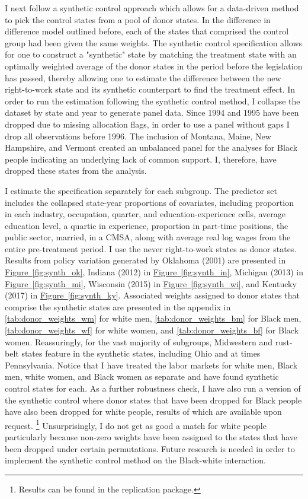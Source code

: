 \documentclass[11pt]{article}
\begin{document}
I next follow a synthetic control approach which allows for a data-driven method to pick the control states from a pool of donor states. In the difference in difference model outlined before, each of the states that comprised the control group had been given the same weights. The synthetic control specification allows for one to construct a "synthetic" state by matching the treatment state with an optimally weighted average of the donor states in the period before the legislation has passed, thereby allowing one to estimate the difference between the new right-to-work state and its synthetic counterpart to find the treatment effect. In order to run the estimation following the synthetic control method, I collapse the dataset by state and year to generate panel data. Since 1994 and 1995 have been dropped due to missing allocation flags, in order to use a panel without gaps I drop all observations before 1996. The inclusion of Montana, Maine, New Hampshire, and Vermont created an unbalanced panel for the analyses for Black people indicating an underlying lack of common support. I, therefore, have dropped these states from the analysis. 

I estimate the specification separately for each subgroup. The predictor set includes the collapsed state-year proportions of covariates, including proportion in each industry, occupation, quarter, and education-experience cells, average education level, a quartic in experience, proportion in part-time positions, the public sector, married, in a CMSA, along with average real log wages from the entire pre-treatment period. I use the never right-to-work states as donor states. Results from policy variation generated by Oklahoma (2001) are presented in \hyperref[fig:synth_ok]{Figure~\ref*{fig:synth_ok}}, Indiana (2012) in \hyperref[fig:synth_in]{Figure~\ref*{fig:synth_in}}, Michigan (2013) in \hyperref[fig:synth_mi]{Figure~\ref*{fig:synth_mi}}, Wisconsin (2015) in \hyperref[fig:synth_wi]{Figure~\ref*{fig:synth_wi}}, and Kentucky (2017) in \hyperref[fig:synth_ky]{Figure~\ref*{fig:synth_ky}}. Associated weights assigned to donor states that comprise the synthetic states are presented in the appendix in \autoref{tab:donor_weights_wm} for white men, \autoref{tab:donor_weights_bm} for Black men, \autoref{tab:donor_weights_wf} for white women, and \autoref{tab:donor_weights_bf} for Black women. Reassuringly, for the vast majority of subgroups, Midwestern and rust-belt states feature in the synthetic states, including Ohio and at times Pennsylvania. Notice that I have treated the labor markets for white men, Black men, white women, and Black women as separate and have found synthetic control states for each. As a further robustness check, I have also run a version of the synthetic control where donor states that have been dropped for Black people have also been dropped for white people, results of which are available upon request. \footnote{Results can be found in the replication package.} Unsurprisingly, I do not get as good a match for white people particularly because non-zero weights have been assigned to the states that have been dropped under certain permutations. Future research is needed in order to implement the synthetic control method on the Black-white interaction. 
\end{document}
